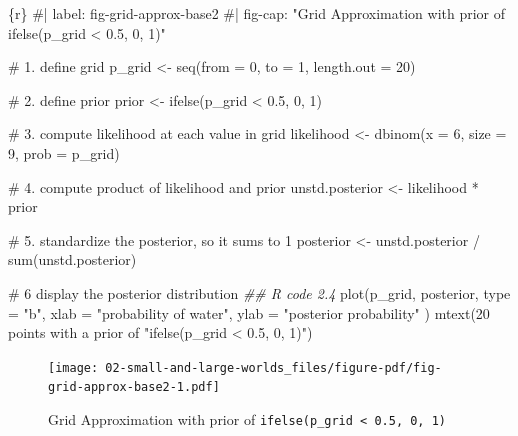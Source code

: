 \documentclass[
  letterpaper,
  DIV=11,
  numbers=noendperiod]{scrreprt}
\newenvironment{Shaded}{\begin{snugshade}}{\end{snugshade}}
\newcommand{\AttributeTok}[1]{\textcolor[rgb]{0.40,0.45,0.13}{#1}}
\newcommand{\CommentTok}[1]{\textcolor[rgb]{0.37,0.37,0.37}{#1}}
\newcommand{\DecValTok}[1]{\textcolor[rgb]{0.68,0.00,0.00}{#1}}
\newcommand{\DocumentationTok}[1]{\textcolor[rgb]{0.37,0.37,0.37}{\textit{#1}}}
\newcommand{\FloatTok}[1]{\textcolor[rgb]{0.68,0.00,0.00}{#1}}
\newcommand{\FunctionTok}[1]{\textcolor[rgb]{0.28,0.35,0.67}{#1}}
\newcommand{\InformationTok}[1]{\textcolor[rgb]{0.37,0.37,0.37}{#1}}
\newcommand{\NormalTok}[1]{\textcolor[rgb]{0.00,0.23,0.31}{#1}}
\newcommand{\OtherTok}[1]{\textcolor[rgb]{0.00,0.23,0.31}{#1}}
\newcommand{\SpecialCharTok}[1]{\textcolor[rgb]{0.37,0.37,0.37}{#1}}
\newcommand{\StringTok}[1]{\textcolor[rgb]{0.13,0.47,0.30}{#1}}
\begin{document}
\begin{Shaded}
\begin{Highlighting}[]
\InformationTok{\textasciigrave{}\textasciigrave{}\textasciigrave{}\{r\}}
\CommentTok{\#| label: fig{-}grid{-}approx{-}base2}
\CommentTok{\#| fig{-}cap: "Grid Approximation with prior of \textasciigrave{}ifelse(p\_grid \textless{} 0.5, 0, 1)\textasciigrave{}"}

\CommentTok{\# 1. define grid}
\NormalTok{p\_grid }\OtherTok{\textless{}{-}} \FunctionTok{seq}\NormalTok{(}\AttributeTok{from =} \DecValTok{0}\NormalTok{, }\AttributeTok{to =} \DecValTok{1}\NormalTok{, }\AttributeTok{length.out =} \DecValTok{20}\NormalTok{)}

\CommentTok{\# 2. define prior}
\NormalTok{prior }\OtherTok{\textless{}{-}} \FunctionTok{ifelse}\NormalTok{(p\_grid }\SpecialCharTok{\textless{}} \FloatTok{0.5}\NormalTok{, }\DecValTok{0}\NormalTok{, }\DecValTok{1}\NormalTok{)}

\CommentTok{\# 3. compute likelihood at each value in grid}
\NormalTok{likelihood }\OtherTok{\textless{}{-}} \FunctionTok{dbinom}\NormalTok{(}\AttributeTok{x =} \DecValTok{6}\NormalTok{, }\AttributeTok{size =} \DecValTok{9}\NormalTok{, }\AttributeTok{prob =}\NormalTok{ p\_grid)}

\CommentTok{\# 4. compute product of likelihood and prior}
\NormalTok{unstd.posterior }\OtherTok{\textless{}{-}}\NormalTok{ likelihood }\SpecialCharTok{*}\NormalTok{ prior}

\CommentTok{\# 5. standardize the posterior, so it sums to 1}
\NormalTok{posterior }\OtherTok{\textless{}{-}}\NormalTok{ unstd.posterior }\SpecialCharTok{/} \FunctionTok{sum}\NormalTok{(unstd.posterior)}

\CommentTok{\# 6 display the posterior distribution }
\DocumentationTok{\#\# R code 2.4}
\FunctionTok{plot}\NormalTok{(p\_grid, posterior,}
  \AttributeTok{type =} \StringTok{"b"}\NormalTok{,}
  \AttributeTok{xlab =} \StringTok{"probability of water"}\NormalTok{, }\AttributeTok{ylab =} \StringTok{"posterior probability"}
\NormalTok{)}
\FunctionTok{mtext}\NormalTok{(}\StringTok{\textquotesingle{}20 points with a prior of "ifelse(p\_grid \textless{} 0.5, 0, 1)"\textquotesingle{}}\NormalTok{)}
\InformationTok{\textasciigrave{}\textasciigrave{}\textasciigrave{}}
\end{Highlighting}
\end{Shaded}

\begin{figure}[H]

{\centering \texttt{[image: 02-small-and-large-worlds\_files/figure-pdf/fig-grid-approx-base2-1.pdf]}

}

\caption{\label{fig-grid-approx-base2}Grid Approximation with prior of
\texttt{ifelse(p\_grid\ \textless{}\ 0.5,\ 0,\ 1)}}

\end{figure}
\end{document}
